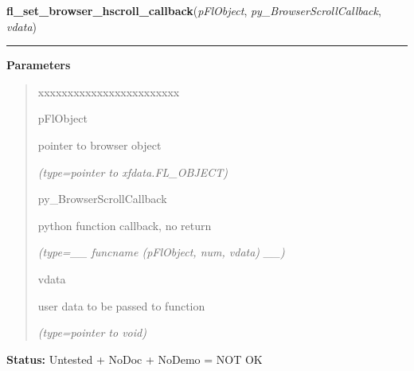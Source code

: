 \hspace{.8\funcindent}\begin{boxedminipage}{\funcwidth}

    \raggedright \textbf{fl\_set\_browser\_hscroll\_callback}(\textit{pFlObject}, \textit{py\_BrowserScrollCallback}, \textit{vdata})

    \vspace{-1.5ex}

    \rule{\textwidth}{0.5\fboxrule}
\setlength{\parskip}{2ex}
\setlength{\parskip}{1ex}
      \textbf{Parameters}
      \vspace{-1ex}

      \begin{quote}
        \begin{Ventry}{xxxxxxxxxxxxxxxxxxxxxxxx}

          \item[pFlObject]

          pointer to browser object

            {\it (type=pointer to xfdata.FL\_OBJECT)}

          \item[py\_BrowserScrollCallback]

          python function callback, no return

            {\it (type=\_\_ funcname (pFlObject, num, vdata) \_\_)}

          \item[vdata]

          user data to be passed to function

            {\it (type=pointer to void)}

        \end{Ventry}

      \end{quote}

\textbf{Status:} Untested + NoDoc + NoDemo = NOT OK



    \end{boxedminipage}

    \label{xformslib:flbrowser:fl_set_browser_vscroll_callback}

    \vspace{0.5ex}

